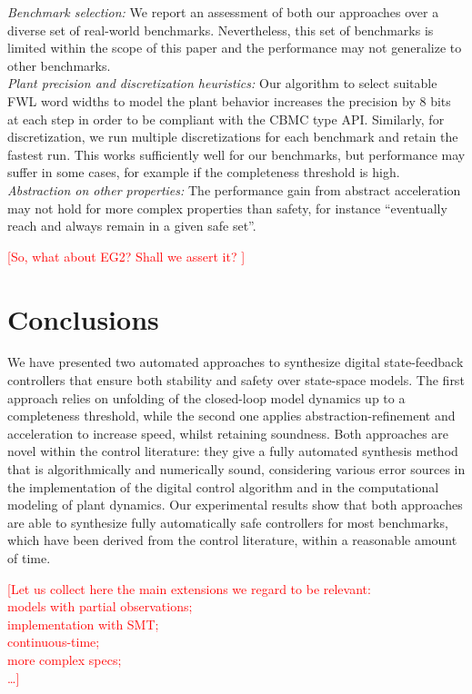 \documentclass[twocolumn]{autart}    %
\renewcommand{\note}[1]{\textcolor{red}{[#1]}}
\begin{document}
\textit{Benchmark selection:} We report an assessment of both our approaches
over a diverse set of real-world benchmarks.  Nevertheless, this set of
benchmarks is limited within the scope of this paper and the performance may
not generalize to other benchmarks.\\
%
\textit{Plant precision and discretization heuristics:} Our algorithm to
select suitable FWL word widths to model the plant behavior 
increases the precision by 8 bits at each step 
in order to be compliant with the CBMC type API. 
Similarly, for discretization, we run multiple discretizations for each
benchmark and retain the fastest run.
This works sufficiently well for our benchmarks, but
performance may suffer in some cases, for example if the completeness
threshold is high.\\
%
\textit{Abstraction on other properties:} The performance gain from abstract
acceleration may not hold for more complex properties than safety, for
instance ``eventually reach and always remain in a given safe set''.

\note{So, what about EG2? Shall we assert it? }

\section{Conclusions}
\label{sec:conclusions}

We have presented two automated approaches to synthesize digital
state-feedback controllers that ensure both stability and safety over state-space models.   
The first approach relies on unfolding of the closed-loop model dynamics up to a completeness threshold, while the second
one applies abstraction-refinement and acceleration to increase speed, whilst retaining soundness.
%
Both approaches are novel within the control literature: they give a fully
automated synthesis method that is algorithmically and numerically sound,
considering various error sources in the implementation of the digital
control algorithm and in the computational modeling of plant dynamics.
%
Our experimental results show that both approaches are able to synthesize fully automatically 
safe controllers for most benchmarks, which have been derived from the control literature, 
within a reasonable amount of time.  

\note{Let us collect here the main extensions we regard to be relevant: \\ 
models with partial observations; \\ 
implementation with SMT; \\ 
continuous-time; \\ 
more complex specs; \\ 
\ldots }
\end{document}
